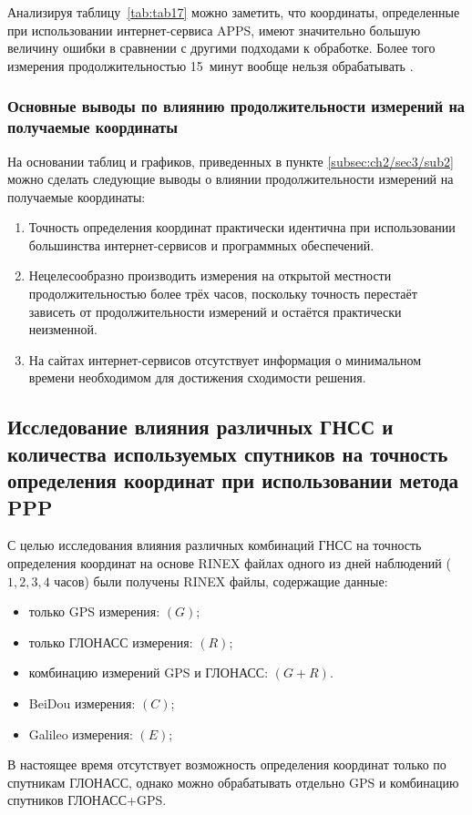 Анализируя таблицу~\cref{tab:tab17} можно заметить, что координаты, определенные при использовании интернет-сервиса APPS, имеют значительно большую величину ошибки в сравнении с другими подходами к обработке. Более того измерения продолжительностью  15~минут вообще нельзя обрабатывать \cite{mak03,mak06}.




\subsubsection{Основные выводы по влиянию продолжительности измерений на получаемые координаты }\label{subsec:ch2/sec3/sub2/sub4}

На основании таблиц и графиков, приведенных в пункте \cref{subsec:ch2/sec3/sub2} можно сделать следующие выводы о влиянии продолжительности измерений на получаемые координаты:

\begin{enumerate}
	\item Точность определения координат практически идентична при использовании большинства интернет-сервисов и программных обеспечений.
	\item Нецелесообразно производить измерения на открытой местности продолжительностью более трёх часов, поскольку точность перестаёт зависеть от продолжительности измерений и остаётся практически неизменной.
	\item На сайтах интернет-сервисов отсутствует информация о минимальном времени необходимом для достижения сходимости решения.
\end{enumerate}




\subsection[Влияние используемых ГНСС и количества спутников]{Исследование влияния различных ГНСС и количества используемых спутников на точность определения координат при использовании метода PPP}\label{subsec:ch2/sec3/sub3}

С целью исследования влияния различных комбинаций ГНСС на точность определения координат на основе RINEX файлах одного из дней наблюдений ($1, 2, 3, 4$ часов) были получены RINEX файлы, содержащие данные:
\begin{itemize}
	\item только GPS измерения: $(G)$;
	\item только ГЛОНАСС измерения: $(R)$;
	\item комбинацию измерений GPS и ГЛОНАСС: $(G+R)$.
	\item BeiDou измерения: $(C)$;
	\item Galileo измерения: $(E)$;

\end{itemize}
В настоящее время отсутствует возможность определения координат только по спутникам ГЛОНАСС, однако можно обрабатывать отдельно GPS и комбинацию спутников ГЛОНАСС\thinspace+\thinspace GPS.

